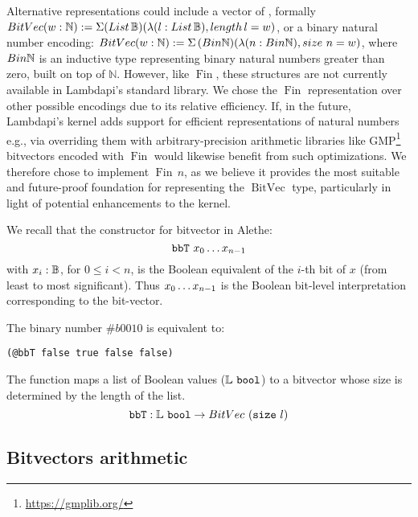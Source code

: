 Alternative representations could include a vector of \B{},
formally $\mathop{BitVec}(w: \mathbb{N}) := \Sigma(\mathop{List\,\mathbb{B}})(\lambda(l: \mathop{List\,\mathbb{B}}),\mathop{length}l = w)$,
or a binary natural number encoding: $\mathop{BitVec}(w: \mathbb{N}) := \Sigma\,(\mathop{Bin\mathbb{N}})(\lambda (n:\mathop{Bin\mathbb{N}}), \mathop{size}\,n = w)$, where $\mathop{Bin\mathbb{N}}$
is an inductive type representing binary natural numbers greater than zero, built on top of $\mathbb{N}$.
However, like $\mathop{Fin}$, these structures are not currently available in Lambdapi's standard library.
We chose the $\mathop{Fin}$ representation over other possible encodings due to its relative efficiency.
If, in the future, Lambdapi's kernel adds support for efficient representations of natural numbers e.g.,
via overriding them with arbitrary-precision arithmetic libraries like GMP\footnote{\url{https://gmplib.org/}} bitvectors encoded with $\mathop{Fin}$ would likewise benefit from such optimizations.
We therefore chose to implement $\mathop{Fin}\,n$, as we believe it provides the most suitable and future-proof foundation for representing the $\mathop{BitVec}$ type,
particularly in light of potential enhancements to the kernel.


We recall that the constructor for bitvector in Alethe: $$\mathtt{bbT}\ \enum[n-1]{x}[][0]$$ with $x_i: \mathbb{B}$, for $0\leq i< n$,
is the Boolean equivalent of the $i$-th bit of $x$ (from least to most significant). Thus $\enum[n-1]{x}[][0]$ is the Boolean bit-level interpretation corresponding to the bit-vector. 

\begin{example}
The binary number $\#b0010$ is equivalent to:

\begin{lstlisting}[language=SMT]
(@bbT false true false false)
\end{lstlisting}
\end{example}

\begin{definition}
The function  maps a list of Boolean values ($\mathbb{L}~\texttt{\upshape{bool}}$) to a bitvector whose size is determined by the length of the list.
\begin{equation*}
\texttt{\upshape{bbT}} : \mathbb{L}~\texttt{\upshape{bool}} \rightarrow BitVec~(\texttt{\upshape{size}}~l)
\end{equation*}
\end{definition}

\subsection{Bitvectors arithmetic}


